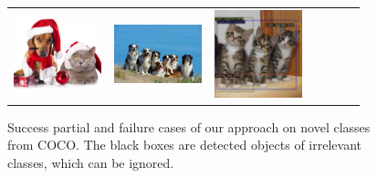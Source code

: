 {\begin{figure}[!ht]
{\begin{tabular}{ccccccc}
			\includegraphics[width=1in]{figs/wrong/cat_dog_res.jpg} & \includegraphics[width=1in]{figs/wrong/many_dogs_res.jpg} & \includegraphics[width=1in]{figs/wrong/three_cat_res.jpg}\\
	\end{tabular}}
    \caption{Success partial and failure cases of our approach on novel classes from COCO. The black boxes are detected objects of irrelevant classes, which can be ignored. \vspace{1mm}}
    \label{fig:det-vis}
\end{figure}}


